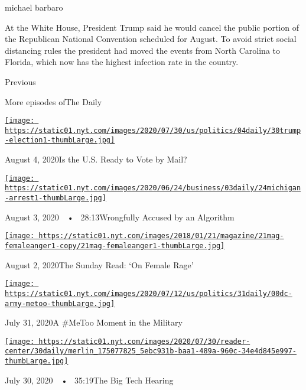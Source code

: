 michael barbaro

At the White House, President Trump said he would cancel the public
portion of the Republican National Convention scheduled for August. To
avoid strict social distancing rules the president had moved the events
from North Carolina to Florida, which now has the highest infection rate
in the country.

Previous

More episodes ofThe Daily

\href{https://www.nytimes.com/2020/08/04/podcasts/the-daily/mail-in-voting-president-trump.html?action=click\&module=audio-series-bar\&region=header\&pgtype=Article}{\texttt{[image: https://static01.nyt.com/images/2020/07/30/us/politics/04daily/30trump-election1-thumbLarge.jpg]}}

August 4, 2020Is the U.S. Ready to Vote by Mail?

\href{https://www.nytimes.com/2020/08/03/podcasts/the-daily/algorithmic-justice-racism.html?action=click\&module=audio-series-bar\&region=header\&pgtype=Article}{\texttt{[image: https://static01.nyt.com/images/2020/06/24/business/03daily/24michigan-arrest1-thumbLarge.jpg]}}

August 3, 2020~~•~ 28:13Wrongfully Accused by an Algorithm

\href{https://www.nytimes.com/2020/08/02/podcasts/the-daily/on-female-rage.html?action=click\&module=audio-series-bar\&region=header\&pgtype=Article}{\texttt{[image: https://static01.nyt.com/images/2018/01/21/magazine/21mag-femaleanger1-copy/21mag-femaleanger1-thumbLarge.jpg]}}

August 2, 2020The Sunday Read: `On Female Rage'

\href{https://www.nytimes.com/2020/07/31/podcasts/the-daily/vanessa-guillen-military-metoo.html?action=click\&module=audio-series-bar\&region=header\&pgtype=Article}{\texttt{[image: https://static01.nyt.com/images/2020/07/12/us/politics/31daily/00dc-army-metoo-thumbLarge.jpg]}}

July 31, 2020A \#MeToo Moment in the Military

\href{https://www.nytimes.com/2020/07/30/podcasts/the-daily/congress-facebook-amazon-google-apple.html?action=click\&module=audio-series-bar\&region=header\&pgtype=Article}{\texttt{[image: https://static01.nyt.com/images/2020/07/30/reader-center/30daily/merlin\_175077825\_5ebc931b-baa1-489a-960c-34e4d845e997-thumbLarge.jpg]}}

July 30, 2020~~•~ 35:19The Big Tech Hearing

